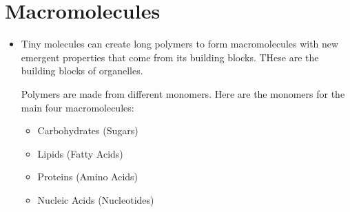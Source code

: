 \documentclass[letterpaper]{article}
\numberwithin{equation}{section}
\theoremstyle{classic}
\begin{document}
\section{Macromolecules}
    \begin{itemize}
    \item Tiny molecules can create long polymers to form macromolecules with new emergent properties that come from its building blocks. THese are the building blocks of organelles.
    \begin{idea}
        Polymers are made from different monomers. Here are the monomers for the main four macromolecules:
        \begin{multicols}{2}
        \begin{itemize}
            \item Carbohydrates (Sugars)
            \item Lipids (Fatty Acids)
            \item Proteins (Amino Acids)
            \item Nucleic Acids (Nucleotides)
        \end{itemize}
        \end{multicols}
    \end{idea}

\end{itemize}
\end{document}

